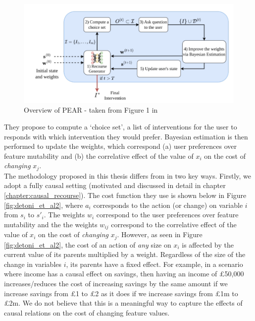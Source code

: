 \begin{figure}[!htb]
	\centering
	\includegraphics[width=0.75\linewidth]{images/detoni_et_al.png}
	\caption{Overview of PEAR - taken from Figure 1 in \textcite{detoniPersonalizedAlgorithmicRecourse2023}}
	\label{fig:detoni_et_al}
\end{figure}

They propose to compute a `choice set', a list of interventions for the user to responds with which intervention they would prefer. Bayesian estimation is then performed to update the weights, which correspond (a) user preferences over feature mutability and (b) the correlative effect of the value of $x_i$ on the cost of \textit{changing} $x_j$.\\

The methodology proposed in this thesis differs from \textcite{detoniPersonalizedAlgorithmicRecourse2023} in two key ways. Firstly, we adopt a fully causal setting (motivated and discussed in detail in chapter \ref{chapter:causal_recourse}). The cost function they use is shown below in Figure \ref{fig:detoni_et_al2}, where $a_i$ corresponds to the action (or change) on variable $i$ from $s_i$ to $s'_i$. The weights $w_i$ correspond to the user preferences over feature mutability and the the weights $w_{ij}$ correspond to the correlative effect of the value of $x_i$ on the cost of \textit{changing} $x_j$. However, as seen in Figure \ref{fig:detoni_et_al2}, the cost of an action of \textit{any} size on $x_i$ is affected by the current value of its parents multiplied by a weight. Regardless of the size of the change in variables $i$, its parents have a fixed effect. For example, in a scenario where income has a causal effect on savings, then having an income of £50,000 increases/reduces the cost of increasing savings by the same amount if we increase savings from £1 to £2 as it does if we increase savings from £1m to £2m. We do not believe that  this is a meaningful way to capture the effects of causal relations on the cost of changing feature values.

